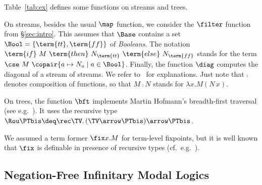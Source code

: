 \begin{example}
\label{ex:pure:fun}
Table~\ref{tab:ex} defines some functions on streams and trees.

On streams, besides the usual $\map$ function,
we consider the $\filter$ function from \S\ref{sec:intro}.
This assumes that $\Base$ contains a set $\Bool = \{\term{tt},\term{ff} \}$
of \emph{Booleans}.
The notation
$\term{if}~ M ~\term{then}~ N_{\term{tt}} ~\term{else}~ N_{\term{ff}}$
stands for the term
$\cse\ M\ \copair{a \mapsto N_a \mid a \in \Bool}$.
Finally, the function $\diag$ computes the diagonal of a stream of streams.
We refer to~\cite[Example 8.3]{jr21esop} for explanations.
Just note that
$\comp$ denotes composition of functions,
so that $M \comp N$ stands for $\lambda x. M(N\, x)$.

On trees, the function $\bft$ implements Martin Hofmann's breadth-first traversal
(see e.g.~\cite{bms19types,jr21esop}).
It uses the recursive type
$\Rou\PTbis \deq \rec\TV.\, (\TV \arrow \PTbis) \arrow \PTbis$.
\end{example}


\begin{full}
\begin{remark*} %
We assumed a term former $\fix x.M$ for term-level fixpoints,
but it is well known that $\fix$ is definable in presence of recursive types
(cf.\ e.g.\ \cite[\S 20.1]{pierce02book}).
\end{remark*}
\end{full}

\subsection{Negation-Free Infinitary Modal Logics}
\label{sec:log}


